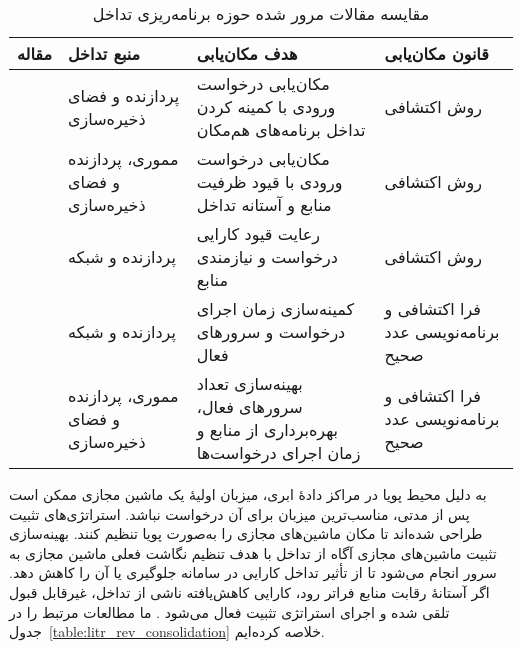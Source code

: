 \begin{table}[t]
\center
\caption{مقایسه مقالات مرور شده حوزه برنامه‌ریزی تداخل}
\begin{tabular}{|c|p{3cm}|p{6cm}|p{4cm}|}
\hline
مقاله & منبع تداخل & هدف مکان‌یابی & قانون مکان‌یابی \\
\hline
\hline
\cite{Chiang2011TRACON} & پردازنده و فضای ذخیره‌سازی & مکان‌یابی درخواست ورودی با کمینه کردن تداخل برنامه‌های هم‌مکان & روش اکتشافی \\
\cite{jersak2016performance} & مموری، پردازنده و فضای ذخیره‌سازی & مکان‌یابی درخواست ورودی با قیود ظرفیت منابع و آستانه تداخل & روش اکتشافی \\
\cite{sampaio2015piasa} & پردازنده و شبکه & رعایت قیود کارایی درخواست و نیازمندی منابع & روش اکتشافی \\
\cite{meloalves2018interference} & پردازنده و شبکه & کمینه‌سازی زمان اجرای درخواست و سرورهای فعال & فرا اکتشافی و برنامه‌نویسی عدد صحیح \\
\cite{hamdi2019managing} & مموری، پردازنده و فضای ذخیره‌سازی & بهینه‌سازی تعداد سرورهای فعال، بهره‌برداری از منابع و زمان اجرای درخواست‌ها & فرا اکتشافی و برنامه‌نویسی عدد صحیح \\
\hline
\end{tabular}
\label{table:litr_rev_schedule}
\end{table}

به دلیل محیط پویا در مراکز دادهٔ ابری، میزبان اولیهٔ یک ماشین مجازی ممکن است پس از مدتی، مناسب‌ترین میزبان برای آن درخواست نباشد. استراتژی‌های تثبیت طراحی شده‌اند تا مکان ماشین‌های مجازی را به‌صورت پویا تنظیم کنند. بهینه‌سازی تثبیت ماشین‌های مجازی آگاه از تداخل با هدف تنظیم نگاشت فعلی ماشین مجازی به سرور انجام می‌شود تا از تأثیر تداخل کارایی در سامانه جلوگیری یا آن را کاهش دهد. اگر آستانهٔ رقابت منابع فراتر رود، کارایی کاهش‌یافته ناشی از تداخل، غیرقابل قبول تلقی شده و اجرای استراتژی تثبیت فعال می‌شود \cite{Zhang2013CPI2, zhu2012performance}. ما مطالعات مرتبط را در جدول~\ref{table:litr_rev_consolidation} خلاصه کرده‌ایم.

